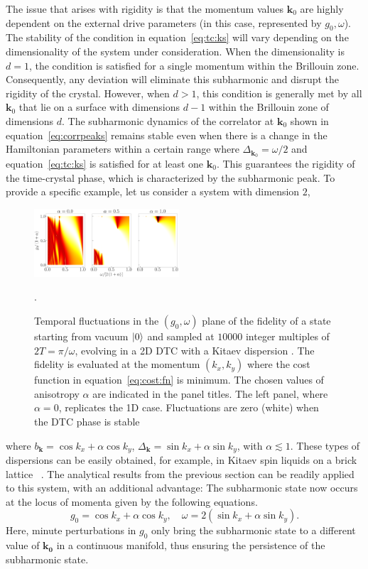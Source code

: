 \documentclass[preprint,5p,times,twocolumn]{elsarticle}
\newcommand{\bmk}{\bm{k}}
\begin{document}
The issue that arises with rigidity is that the momentum values $\bmk_0$ are highly dependent on the external drive parameters (in this case, represented by $g_0, \omega$). The stability of the condition in equation~\ref{eq:tc:ks} will vary depending on the dimensionality of the system under consideration. When the dimensionality is $d=1$, the condition is satisfied for a single momentum within the Brillouin zone. Consequently, any deviation will eliminate this subharmonic and disrupt the rigidity of the crystal. However, when $d>1$, this condition is generally met by all $\bmk_{0}$ that lie on a surface with dimensions $d-1$ within the Brillouin zone of dimensions $d$. The subharmonic dynamics of the correlator at $\bmk_0$ shown in equation~\ref{eq:corrpeaks} remains stable even when there is a change in the Hamiltonian parameters within a certain range where $\Delta_{\bmk_{0}}=\omega/2$ and equation~\ref{eq:tc:ks} is satisfied for at least one $\bmk_{0}$. This guarantees the rigidity of the time-crystal phase, which is characterized by the subharmonic peak. To provide a specific example, let us consider a system with dimension $2$, 
\begin{figure}[t!]
    \includegraphics[width=0.48\textwidth, keepaspectratio]{fig2_fidelity.png}
    \caption{Temporal fluctuations in the $(g_0,\omega)$ plane of the fidelity of a state starting from vacuum $\ket{0}$ and
    sampled at $10000$ integer multiples of $2T=\pi/\omega$, evolving in a 2D DTC with a Kitaev dispersion . The fidelity is evaluated at the momentum $(k_x, k_y)$ where the cost function in equation~\ref{eq:cost:fn} is minimum. The chosen values of anisotropy $\alpha$ are indicated in the panel titles. The left panel, where $\alpha=0$, replicates the 1D case. Fluctuations are zero (white) when the DTC phase is stable}
\label{fig:fluctuations}.
\end{figure}
where $b_{\bmk} = \cos{k_x} + \alpha \cos{k_y}$, $\Delta_{\bmk} = \sin{k_x} + \alpha \sin{k_y}$, with $\alpha \lesssim 1$. These types of dispersions can be easily obtained, for example, in Kitaev spin liquids on a brick lattice ~\citep{Chen_2008}. The analytical results from the previous section can be readily applied to this system, with an additional advantage: The subharmonic state now occurs at the locus of momenta given by the following equations.
\begin{equation}
    g_0 = \cos{k_x} + \alpha\cos{k_y}, \quad \omega = 2\left(\sin{k_x} + \alpha\sin{k_y}\right).
    \label{eq:tcpoint:kitaev}
\end{equation}
Here, minute perturbations in $g_0$ only bring the subharmonic state to a different value of $\bm{k_0}$ in a continuous manifold, thus ensuring the persistence of the subharmonic state. 
\end{document}
